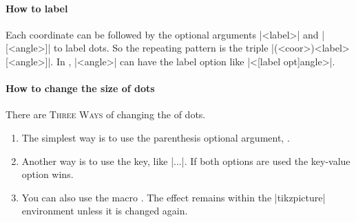 \begin{tzcode}{.3}
\end{tzcode}

\paragraph{How to label}

Each coordinate can be followed by the optional arguments |{<label>}| and |[<angle>]| to label dots. So the repeating pattern is the triple |(<coor>){<label>}[<angle>]|. In \Tikz, |<angle>| can have the label option like |<[label opt]angle>|.

\begin{tzcode}{.3}
\end{tzcode}

\paragraph{How to change the size of dots}

There are \textsc{Three Ways} of changing the  of dots.
\begin{enumerate}
\item The simplest way is to use the  parenthesis optional argument, .
\item Another way is to use the  key, like |\tzcdots[tzcdot=3pt]...|.
If both options are used the key-value option wins.
\item You can also use the macro \icmd{\settzcdotradius}.
The effect remains within the |tikzpicture| environment unless it is changed again.
\end{enumerate}

\begin{tzcode}{.3}
\end{tzcode}



